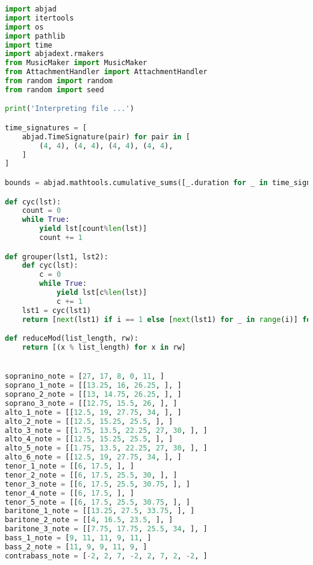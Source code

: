 \begin{lstlisting}[language=Python, caption=Invocation Source Code]
import abjad
import itertools
import os
import pathlib
import time
import abjadext.rmakers
from MusicMaker import MusicMaker
from AttachmentHandler import AttachmentHandler
from random import random
from random import seed

print('Interpreting file ...')

time_signatures = [
    abjad.TimeSignature(pair) for pair in [
        (4, 4), (4, 4), (4, 4), (4, 4),
    ]
]

bounds = abjad.mathtools.cumulative_sums([_.duration for _ in time_signatures])

def cyc(lst):
    count = 0
    while True:
        yield lst[count%len(lst)]
        count += 1

def grouper(lst1, lst2):
    def cyc(lst):
        c = 0
        while True:
            yield lst[c%len(lst)]
            c += 1
    lst1 = cyc(lst1)
    return [next(lst1) if i == 1 else [next(lst1) for _ in range(i)] for i in lst2]

def reduceMod(list_length, rw):
    return [(x % list_length) for x in rw]


sopranino_note = [27, 17, 8, 0, 11, ]
soprano_1_note = [[13.25, 16, 26.25, ], ]
soprano_2_note = [[13, 14.75, 26.25, ], ]
soprano_3_note = [[12.75, 15.5, 26, ], ]
alto_1_note = [[12.5, 19, 27.75, 34, ], ]
alto_2_note = [[12.5, 15.25, 25.5, ], ]
alto_3_note = [[1.75, 13.5, 22.25, 27, 30, ], ]
alto_4_note = [[12.5, 15.25, 25.5, ], ]
alto_5_note = [[1.75, 13.5, 22.25, 27, 30, ], ]
alto_6_note = [[12.5, 19, 27.75, 34, ], ]
tenor_1_note = [[6, 17.5, ], ]
tenor_2_note = [[6, 17.5, 25.5, 30, ], ]
tenor_3_note = [[6, 17.5, 25.5, 30.75, ], ]
tenor_4_note = [[6, 17.5, ], ]
tenor_5_note = [[6, 17.5, 25.5, 30.75, ], ]
baritone_1_note = [[13.25, 27.5, 33.75, ], ]
baritone_2_note = [[4, 16.5, 23.5, ], ]
baritone_3_note = [[7.75, 17.75, 25.5, 34, ], ]
bass_1_note = [9, 11, 11, 9, 11, ]
bass_2_note = [11, 9, 9, 11, 9, ]
contrabass_note = [-2, 2, 7, -2, 2, 7, 2, -2, ]



\end{lstlisting}
